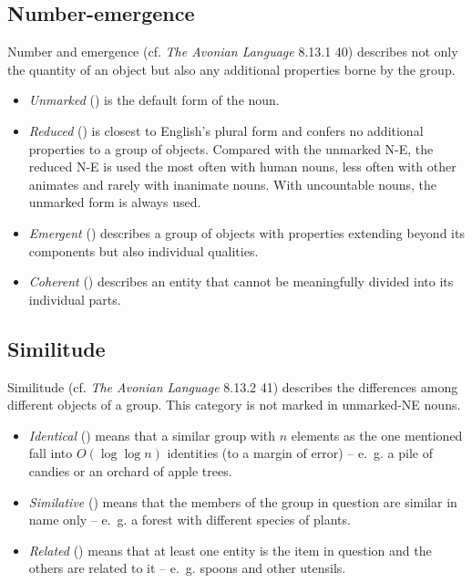\documentclass{book}
\begin{document}
\subsection{Number-emergence}

Number and emergence (cf. \emph{The Avonian Language} 8.13.1 40) describes not only the quantity of an object but also any additional properties borne by the group.

\begin{itemize}
  \item \emph{Unmarked} () is the default form of the noun.
  \item \emph{Reduced} () is closest to English's plural form and confers no additional properties to a group of objects. Compared with the unmarked N-E, the reduced N-E is used the most often with human nouns, less often with other animates and rarely with inanimate nouns. With uncountable nouns, the unmarked form is always used.
  \item \emph{Emergent} () describes a group of objects with properties extending beyond its components but also individual qualities.
  \item \emph{Coherent} () describes an entity that cannot be meaningfully divided into its individual parts.
\end{itemize}

\subsection{Similitude}

Similitude (cf. \emph{The Avonian Language} 8.13.2 41) describes the differences among different objects of a group. This category is not marked in unmarked-NE nouns.

\begin{itemize}
  \item \emph{Identical} () means that a similar group with $n$ elements as the one mentioned fall into $O(\log \log n)$ identities (to a margin of error) -- e.~g. a pile of candies or an orchard of apple trees.
  \item \emph{Similative} () means that the members of the group in question are similar in name only -- e.~g. a forest with different species of plants.
  \item \emph{Related} () means that at least one entity is the item in question and the others are related to it -- e.~g. spoons and other utensils.
\end{itemize}
\end{document}
